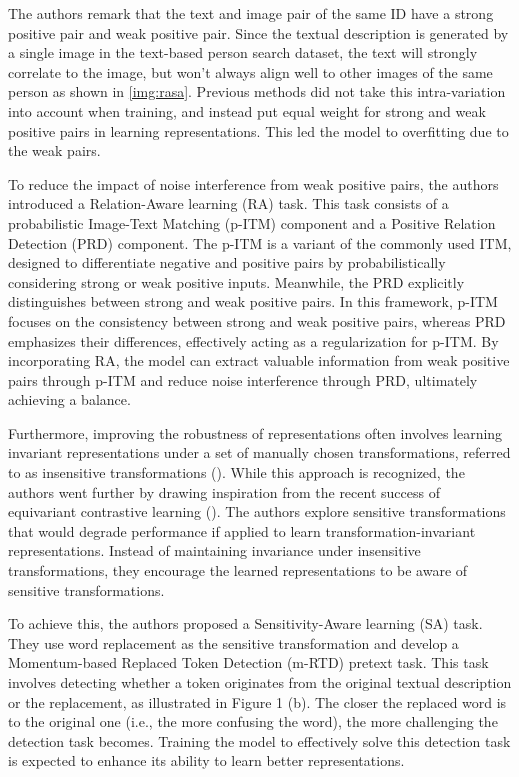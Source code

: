 The authors remark that the text and image pair of the same ID have a strong positive pair and weak positive pair. Since the textual description is generated by a single image in the text-based person search dataset, the text will strongly correlate to the image, but won't always align well to other images of the same person as shown in \ref{img:rasa}. Previous methods did not take this intra-variation into account when training, and instead put equal weight for strong and weak positive pairs in learning representations. This led the model to overfitting due to the weak pairs.

To reduce the impact of noise interference from weak positive pairs, the authors introduced a Relation-Aware learning (RA) task. This task consists of a probabilistic Image-Text Matching (p-ITM) component and a Positive Relation Detection (PRD) component. The p-ITM is a variant of the commonly used ITM, designed to differentiate negative and positive pairs by probabilistically considering strong or weak positive inputs. Meanwhile, the PRD explicitly distinguishes between strong and weak positive pairs. In this framework, p-ITM focuses on the consistency between strong and weak positive pairs, whereas PRD emphasizes their differences, effectively acting as a regularization for p-ITM. By incorporating RA, the model can extract valuable information from weak positive pairs through p-ITM and reduce noise interference through PRD, ultimately achieving a balance.

Furthermore, improving the robustness of representations often involves learning invariant representations under a set of manually chosen transformations, referred to as insensitive transformations (\cite{caron2021unsupervisedlearningvisualfeatures}). While this approach is recognized, the authors went further by drawing inspiration from the recent success of equivariant contrastive learning (\cite{dangovski2022equivariantcontrastivelearning}). The authors explore sensitive transformations that would degrade performance if applied to learn transformation-invariant representations. Instead of maintaining invariance under insensitive transformations, they encourage the learned representations to be aware of sensitive transformations. 

To achieve this, the authors proposed a Sensitivity-Aware learning (SA) task. They use word replacement as the sensitive transformation and develop a Momentum-based Replaced Token Detection (m-RTD) pretext task. This task involves detecting whether a token originates from the original textual description or the replacement, as illustrated in Figure 1 (b). The closer the replaced word is to the original one (i.e., the more confusing the word), the more challenging the detection task becomes. Training the model to effectively solve this detection task is expected to enhance its ability to learn better representations.

